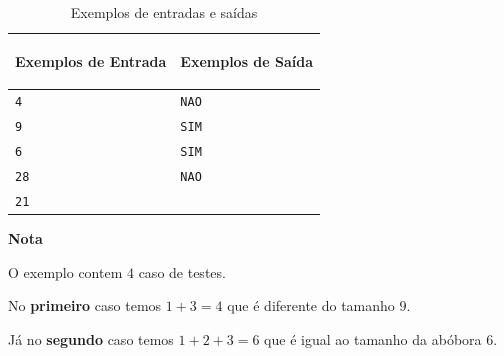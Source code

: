 \begin{table}[ht]
    \centering
    \begin{tabular}{|p{7cm}|p{7cm}|}
        \hline
        \begin{center}
            \vspace{-0.3cm}
            \textbf{Exemplos de Entrada}
            \vspace{-0.3cm}
        \end{center} 
         &  
        \begin{center}
            \vspace{-0.3cm}
            \textbf{Exemplos de Saída}
            \vspace{-0.3cm}
        \end{center} \\ \hline
         \texttt{4} & \texttt{NAO} \\
         \texttt{9} & \texttt{SIM} \\
         \texttt{6} & \texttt{SIM} \\
         \texttt{28} & \texttt{NAO} \\
         \texttt{21} & \texttt{} \\
         \hline
    \end{tabular}
    
    \caption{Exemplos de entradas e saídas}
    \label{tab:inputA3}
    
\end{table}


\vspace{0.3cm}
\textbf{Nota}

O exemplo contem $4$ caso de testes.

No \textbf{primeiro} caso temos $1+3 = 4$ que é diferente do tamanho $9$.

Já no \textbf{segundo} caso temos $1+2+3 = 6$ que é igual ao tamanho da abóbora $6$.

\newpage

\begin{center}
\noindent

\end{center}